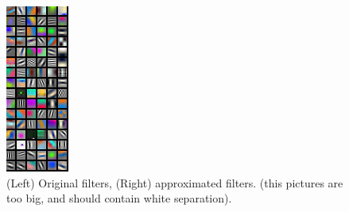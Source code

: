 \documentclass{article}
\begin{document}
\begin{figure}[ht]
\begin{minipage}[b]{0.48\linewidth}
  \end{minipage}
  \begin{minipage}[b]{0.48\linewidth}
  	\includegraphics[width=\textwidth]{img/first_appr.png}
  \end{minipage}
  \caption{(Left) Original filters, (Right) approximated filters. (this pictures are too big, and should contain white separation).}
\end{figure}
\end{document}
